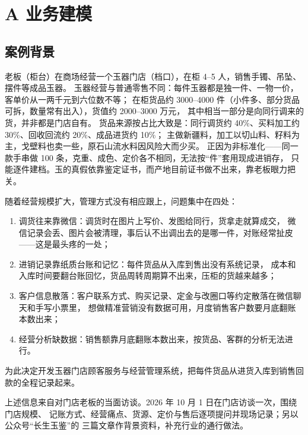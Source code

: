\chapter{A 业务建模}

\section{案例背景}

老板（柜台）在商场经营一个玉器门店（档口），在柜 4–5 人，销售手镯、吊坠、摆件等成品玉器。
玉器经营与普通零售不同：每件玉器都是独一件、一物一价，客单价从一两千元到六位数不等；
在柜货品约 3000–4000 件（小件多、部分货品可拆，数量常有出入），货值约 2000–3000 万元，
其中相当一部分是向同行调来的货，并非都是门店自有。
货品来源按占比大致是：同行调货约 40\%、买料加工约 30\%、回收回流约 20\%、成品进货约 10\%；
主做新疆料，加工以切山料、籽料为主，戈壁料也卖一些，原石山流水料因风险大而少买。
正因为非标准化——同一款手串做 100 条，克重、成色、定价各不相同，无法按“件”套用现成进销存，
只能逐件建档。玉的真假依靠鉴定证书，而产地目前证书做不出来，靠老板眼力把关。

随着经营规模扩大，管理方式没有相应跟上，问题集中在四处：

\begin{enumerate}[leftmargin=1.6em, itemsep=2pt]
  \item 调货往来靠微信：调货时在图片上写价、发图给同行，货拿走就算成交，
        微信记录会丢、图片会被清理，事后认不出调出去的是哪一件，对账经常扯皮——这是最头疼的一处；
  \item 进销记录靠纸质台账和记忆：每件货品从入库到售出没有系统记录，
        成本和入库时间要翻台账回忆，货品周转周期算不出来，压柜的货越来越多；
  \item 客户信息散落：客户联系方式、购买记录、定金与改圈口等约定散落在微信聊天和手写小票里，
        想做精准营销没有数据可用，月度销售客户数要月底翻账本数出来；
  \item 经营分析缺数据：销售额靠月底翻账本数出来，按货品、客群的分析无法进行。
\end{enumerate}

为此决定开发玉器门店顾客服务与经营管理系统，把每件货品从进货入库到销售回款的全程记录起来。

上述信息来自对门店老板的当面访谈。2026 年 10 月 1 日在门店访谈一次，围绕门店规模、
记账方式、经营痛点、货源、定价与售后逐项提问并现场记录；另以公众号“长生玉鉴”的
三篇文章作背景资料，补充行业的通行做法。

